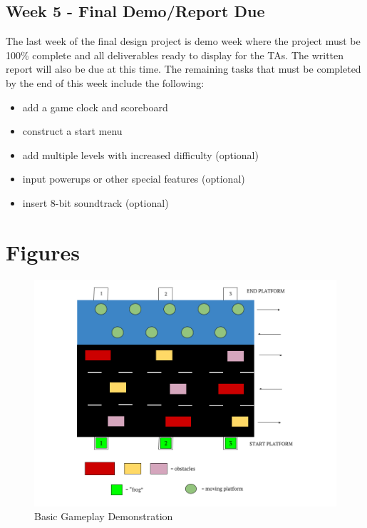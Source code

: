 \documentclass[journal, twocolumn, final,11pt,letterpaper]{IEEEtran}
\begin{document}
\subsection{Week 5 - Final Demo/Report Due}  
The last week of the final design project is demo week where the project must be 100\% complete and all deliverables ready to display for the TAs.  The written report will also be due at this time.  The remaining tasks that must be completed by the end of this week include the following:   

\begin{itemize}
	\item add a game clock and scoreboard
	\item construct a start menu
	\item add multiple levels with increased difficulty (optional)
	\item input powerups or other special features (optional)
	\item insert 8-bit soundtrack (optional)  
\end{itemize}



\section{Figures}


\begin{figure} [H]
	\centering
	\includegraphics[scale=.3]{Frogger.png}
	\caption{Basic Gameplay Demonstration\label{fig:frogger}}
\end{figure}            

     
\end{document}
